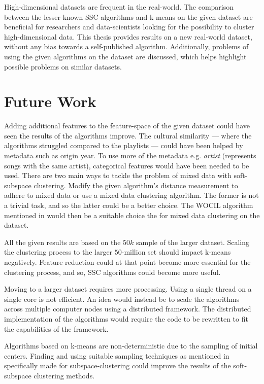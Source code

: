 \documentclass[../report.tex]{subfiles}
\begin{document}
High-dimensional datasets are frequent in the real-world. The comparison between the lesser known SSC-algorithms and k-means on the given dataset are beneficial for researchers and data-scientists looking for the possibility to cluster high-dimensional data. This thesis provides results on a new real-world dataset, without any bias towards a self-published algorithm. Additionally, problems of using the given algorithms on the dataset are discussed, which helps highlight possible problems on similar datasets.

\section{Future Work}
Adding additional features to the feature-space of the given dataset could have seen the results of the algorithms improve. The cultural similarity --- where the algorithms struggled compared to the playlists --- could have been helped by metadata such as origin year. To use more of the metadata e.g. \textit{artist} (represents songs with the same artist), categorical features would have been needed to be used. There are two main ways to tackle the problem of mixed data with soft-subspace clustering. Modify the given algorithm's distance measurement to adhere to mixed data or use a mixed data clustering algorithm. The former is not a trivial task, and so the latter could be a better choice. The WOCIL algorithm mentioned in \cite{Jia2018} would then be a suitable choice the for mixed data clustering on the dataset.

All the given results are based on the $50k$ sample of the larger dataset. Scaling the clustering process to the larger $50$-million set should impact k-means negatively. Feature reduction could at that point become more essential for the clustering process, and so, SSC algorithms could become more useful.

Moving to a larger dataset requires more processing. Using a single thread on a single core is not efficient. An idea would instead be to scale the algorithms across multiple computer nodes using a distributed framework. The distributed implementation of the algorithms would require the code to be rewritten to fit the capabilities of the framework.

Algorithms based on k-means are non-deterministic due to the sampling of initial centers. Finding and using suitable sampling techniques as mentioned in \cite{Gan2016} specifically made for subspace-clustering could improve the results of the soft-subspace clustering methods.
\end{document}
